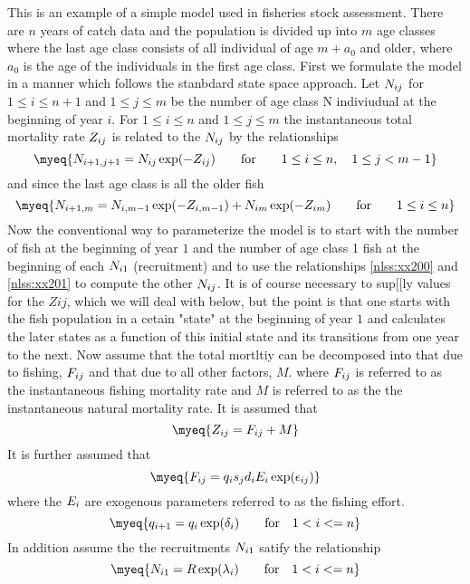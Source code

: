 This is an example of a simple model used in fisheries
stock assessment. There are $n$ years of catch data and the 
population is divided up into $m$ age classes where the last age 
class consists of all individual of age $m+a_0$ and older, 
where $a_0$ is the age of the
individuals in the first age class.
First we formulate the model in a manner which follows the 
stanbdard state space approach. 
Let $N_{ij}$ for $1\le i\le n+1$ and $1\le j\le m$ be the number of age class 
N indiviudual at the beginning of year $i$. 
For $1\le i\le n$ and $1\le j\le m$ the instantaneous total mortality rate
$Z_{ij}$ is related to the $N_{ij}$ by the relationships
\begin{equation}
 \myeq{
   \Nipjp=\Nij\exp(-\Zij) \qquad \hbox{for}\qquad 1\le i\le n,\quad 1\le j<m-1}
    \label{nlss:xx200}
\end{equation}
and since the last age class is all the older fish
\begin{equation}
 \myeq{
   \Nipm= \Nimm\exp(-\Zimm)+ \Nim\exp(-\Zim)\qquad \hbox{for}\qquad 1\le i\le n}
    \label{nlss:xx201}
\end{equation}
Now the conventional way to parameterize the model is to start with
the number of fish at the beginning of year $1$ 
and the number of age class 1 fish at the beginning of each
$N_{i1}$ (recruitment) 
and to use the 
relationships \ref{nlss:xx200} and \ref{nlss:xx201} to compute
the other $N_{ij}$. 
It is of course necessary to sup[[ly values for the $Zij$, which we will deal 
with below, but the point is that one
starts with the fish population in a cetain "state" at the beginning of year
$1$ and calculates the later states as a function of this initial state and
its transitions from one year to the next. Now assume that
the total mortltiy can be decomposed into that due to fishing, $F_{ij}$
and that due to all other factors, $M$. 
where $F_{ij}$ is referred to as 
the instantaneous fishing mortality rate
and $M$ is referred to as the
the instantaneous natural mortality rate.
It is assumed that
\begin{equation}
 \myeq{
   \Zij=\Fij+M 
   }
    \label{nlss:xx202}
\end{equation}
It is further assumed that
\begin{equation}
 \myeq{
   \Fij = \qi \sj \di \Ei \exp(\epsij) 
   }
    \label{nlss:xx203}
\end{equation}
where the $E_i$ are exogenous parameters referred to as the fishing effort.
\begin{equation}
 \myeq{
   \qip=\qi\exp(\deltai) \qquad \hbox{for} \quad 1<i<=n
  }
    \label{nlss:xx204}
\end{equation}
In addition assume the the recruitments $N_{i1}$ satify the relationship 
\begin{equation}
 \myeq{
   \Nio=R\exp(\lami) \qquad \hbox{for} \quad 1<i<=n
  }
\end{equation}

